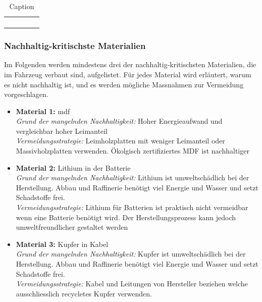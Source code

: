 \begin{table}
    \centering
    \begin{tabular}{ccccc}
         &  &  &  & \\
         &  &  &  & \\
         &  &  &  & \\
         &  &  &  & \\
    \end{tabular}
    \caption{Caption}
    \label{tab:my_label}
\end{table}

\subsubsection{Nachhaltig-kritischste Materialien}
Im Folgenden werden mindestens drei der nachhaltig-kritischsten Materialien, die im Fahrzeug verbaut sind, aufgelistet. Für jedes Material wird erläutert, warum es nicht nachhaltig ist, und es werden mögliche Massnahmen zur Vermeidung vorgeschlagen.

\begin{itemize}
    \item \textbf{Material 1:} \acrfull{mdf} \\
          \textit{Grund der mangelnden Nachhaltigkeit:} Hoher Energieaufwand und vergleichbar hoher Leimanteil  \\
          \textit{Vermeidungsstrategie:} Leimholzplatten mit weniger Leimanteil oder Massivholzplatten verwenden. Ökolgisch zertifiziertes MDF ist nachhaltiger
          
    \item \textbf{Material 2:} Lithium in der Batterie \\
          \textit{Grund der mangelnden Nachhaltigkeit:} Lithium ist umweltschädlich bei der Herstellung. Abbau und Raffinerie benötigt viel Energie und Wasser und setzt Schadstoffe frei. \\
          \textit{Vermeidungsstrategie:} Lithium für Batterien ist praktisch nicht vermeidbar wenn eine Batterie benötigt wird. Der Herstellungsprozess kann jedoch umweltfreundlicher gestaltet werden
          
    \item \textbf{Material 3:} Kupfer in Kabel \\
          \textit{Grund der mangelnden Nachhaltigkeit:} Kupfer ist umweltschädlich bei der Herstellung. Abbau und Raffinerie benötigt viel Energie und Wasser und setzt Schadstoffe frei. \\
          \textit{Vermeidungsstrategie:} Kabel und Leitungen von Hersteller beziehen welche ausschliesslich recycletes Kupfer verwenden.
\end{itemize}

